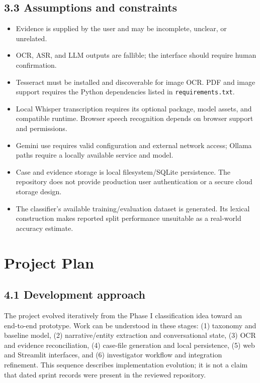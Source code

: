 \documentclass[12pt,a4paper,oneside]{report}
\begin{document}
\section{3.3 Assumptions and constraints}
\begin{itemize}
\item Evidence is supplied by the user and may be incomplete, unclear, or unrelated.
\item OCR, ASR, and LLM outputs are fallible; the interface should require human confirmation.
\item Tesseract must be installed and discoverable for image OCR. PDF and image support requires the Python dependencies listed in \texttt{requirements.txt}.
\item Local Whisper transcription requires its optional package, model assets, and compatible runtime. Browser speech recognition depends on browser support and permissions.
\item Gemini use requires valid configuration and external network access; Ollama paths require a locally available service and model.
\item Case and evidence storage is local filesystem/SQLite persistence. The repository does not provide production user authentication or a secure cloud storage design.
\item The classifier's available training/evaluation dataset is generated. Its lexical construction makes reported split performance unsuitable as a real-world accuracy estimate.
\end{itemize}
\clearpage\chapter{Project Plan}
\section{4.1 Development approach}
The project evolved iteratively from the Phase I classification idea toward an end-to-end prototype. Work can be understood in these stages: (1) taxonomy and baseline model, (2) narrative/entity extraction and conversational state, (3) OCR and evidence reconciliation, (4) case-file generation and local persistence, (5) web and Streamlit interfaces, and (6) investigator workflow and integration refinement. This sequence describes implementation evolution; it is not a claim that dated sprint records were present in the reviewed repository.
\end{document}
